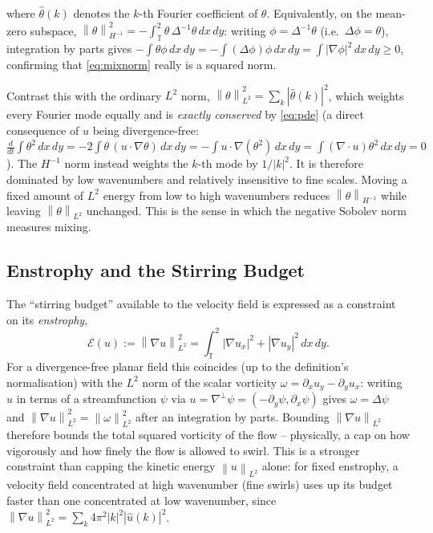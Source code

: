 \documentclass[12pt,a4paper]{article}
\newcommand{\norm}[1]{\left\lVert#1\right\rVert}
\newcommand{\Lap}{\Delta}
\newcommand{\lapinv}{\Delta^{-1}}
\newcommand{\Torus}{\mathbb{T}^2}
\newcommand{\dx}{\,dx\,dy}
\theoremstyle{definition}
\theoremstyle{plain}
\begin{document}
where $\hat\theta(k)$ denotes the $k$-th Fourier coefficient of $\theta$.
Equivalently, on the mean-zero subspace, $\norm{\theta}_{H^{-1}}^2 =
-\int_\Torus \theta\,\lapinv\theta \dx$: writing $\phi = \lapinv\theta$
(i.e.\ $\Lap\phi=\theta$), integration by parts gives $-\int\theta\phi\dx =
-\int(\Lap\phi)\phi\dx = \int|\nabla\phi|^2\dx \ge 0$, confirming that
\eqref{eq:mixnorm} really is a squared norm.

Contrast this with the ordinary $L^2$ norm, $\norm{\theta}_{L^2}^2 =
\sum_k|\hat\theta(k)|^2$, which weights every Fourier mode equally and is
\emph{exactly conserved} by \eqref{eq:pde} (a direct consequence of $u$
being divergence-free: $\frac{d}{dt}\int\theta^2\dx = -2\int\theta\,
(u\cdot\nabla\theta)\dx = -\int u\cdot\nabla(\theta^2)\dx = \int
(\nabla\cdot u)\theta^2\dx = 0$). The $H^{-1}$ norm instead weights the
$k$-th mode by $1/|k|^2$. It is therefore dominated by low wavenumbers and
relatively insensitive to fine scales. Moving a fixed amount of $L^2$
energy from low to high wavenumbers reduces $\norm{\theta}_{H^{-1}}$ while
leaving $\norm{\theta}_{L^2}$ unchanged. This is the sense in which the
negative Sobolev norm measures mixing.

\subsection{Enstrophy and the Stirring Budget}
\label{sec:enstrophy}

The ``stirring budget'' available to the velocity field is expressed as a
constraint on its \emph{enstrophy},
\begin{equation}
  \label{eq:enstrophy}
  \mathcal{E}(u) := \norm{\nabla u}_{L^2}^2
  = \int_\Torus |\nabla u_x|^2 + |\nabla u_y|^2 \dx.
\end{equation}
For a divergence-free planar field this coincides (up to the definition's
normalisation) with the $L^2$ norm of the scalar vorticity $\omega =
\partial_x u_y - \partial_y u_x$: writing $u$ in terms of a streamfunction
$\psi$ via $u = \nabla^\perp\psi = (-\partial_y\psi,\partial_x\psi)$ gives
$\omega = \Lap\psi$ and $\norm{\nabla u}_{L^2}^2 = \norm{\omega}_{L^2}^2$
after an integration by parts. Bounding $\norm{\nabla u}_{L^2}$ therefore
bounds the total squared vorticity of the flow -- physically, a cap on how
vigorously and how finely the flow is allowed to swirl. This is a stronger
constraint than capping the kinetic energy $\norm{u}_{L^2}$ alone: for fixed
enstrophy, a velocity field concentrated at high wavenumber (fine swirls)
uses up its budget faster than one concentrated at low wavenumber, since
$\norm{\nabla u}_{L^2}^2 = \sum_k 4\pi^2|k|^2|\hat u(k)|^2$.
\end{document}
